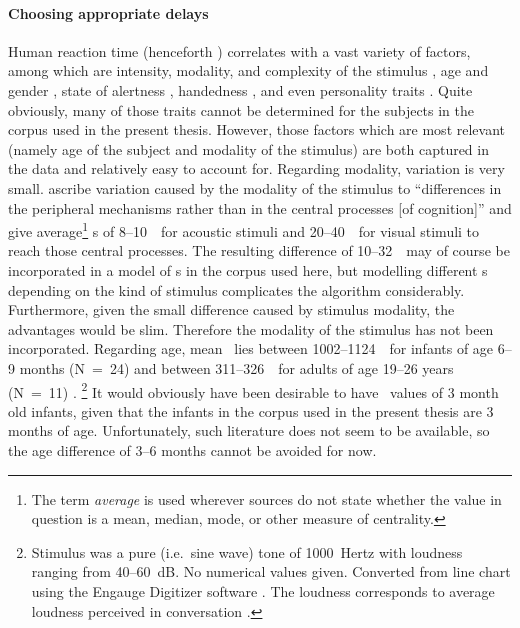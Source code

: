 \paragraph{Choosing appropriate delays}
Human reaction time (henceforth \rt) correlates with a vast variety of factors, among which are intensity, modality, and complexity of the stimulus \citep{brebner_introduction:_1980}, age and gender \citep{der_age_2006}, state of alertness \citep{appelle_simple_1974}, handedness \citep{dane_sex_2003}, and even personality traits \citep{stelmack_personality_1993}.
Quite obviously, many of those traits cannot be determined for the subjects in the corpus used in the present thesis.
However, those factors which are most relevant (namely age of the subject and modality of the stimulus) are both captured in the data and relatively easy to account for.
Regarding modality, variation is very small.
\citet[]{brebner_introduction:_1980} ascribe variation caused by the modality of the stimulus to ``differences in the peripheral mechanisms rather than in the central processes [of cognition]'' and give average\footnote{The term \emph{average} is used wherever sources do not state whether the value in question is a mean, median, mode, or other measure of centrality.} \rt s of 8--10~\ms\ for acoustic stimuli and 20--40~\ms\ for visual stimuli to reach those central processes.
The resulting difference of 10--32~\ms\ may of course be incorporated in a model of \rt s in the corpus used here, but modelling different \rt s depending on the kind of stimulus complicates the algorithm considerably.
Furthermore, given the small difference caused by stimulus modality, the advantages would be slim.
Therefore the modality of the stimulus has not been incorporated.
Regarding age, mean \rt\ lies  between 1002--1124~\ms\ for infants of age 6--9 months (N~=~24) and between 311--326~\ms\ for adults of age 19--26 years (N~=~11) \citep[]{leibold_relationship_2002}.%
\footnote{Stimulus was a pure (i.e.~sine wave) tone of 1000~Hertz with loudness ranging from 40--60~dB.
No numerical values given.
Converted from line chart using the Engauge Digitizer software \citep{mitchell_engauge_2002}.
The loudness corresponds to average loudness perceived in conversation \citep[]{gorne_tontechnik_2006}.}
It would obviously have been desirable to have \rt\ values of 3 month old infants, given that the infants in the  corpus used in the present thesis are 3 months of age.
Unfortunately, such literature does not seem to be available, so the age difference of 3--6 months cannot be avoided for now.
